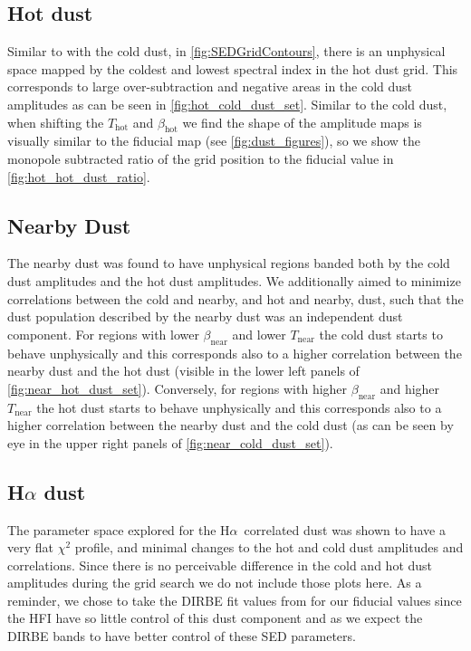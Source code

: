 \documentclass{aa}
\def\Ha{H$\alpha$}
\begin{document}
\subsection{Hot dust}
Similar to with the cold dust, in \cref{fig:SEDGridContours}, there is an unphysical space mapped by the coldest and lowest spectral index in the hot dust grid. This corresponds to large over-subtraction and negative areas in the cold dust amplitudes as can be seen in \cref{fig:hot_cold_dust_set}. Similar to the cold dust, when shifting the $T_\mathrm{hot}$ and $\beta_\mathrm{hot}$ we find the shape of the amplitude maps is visually similar to the fiducial map (see \cref{fig:dust_figures}), so we show the monopole subtracted ratio of the grid position to the fiducial value in \cref{fig:hot_hot_dust_ratio}.

\subsection{Nearby Dust}
The nearby dust was found to have unphysical regions banded both by the cold dust amplitudes and the hot dust amplitudes. We additionally aimed to minimize correlations between the cold and nearby, and hot and nearby, dust, such that the dust population described by the nearby dust was an independent dust component. For regions with lower $\beta_\mathrm{near}$ and lower $T_\mathrm{near}$ the cold dust starts to behave unphysically and this corresponds also to a higher correlation between the nearby dust and the hot dust (visible in the lower left panels of \cref{fig:near_hot_dust_set}). 
Conversely, for regions with higher $\beta_\mathrm{near}$ and higher $T_\mathrm{near}$ the hot dust starts to behave unphysically and this corresponds also to a higher correlation between the nearby dust and the cold dust (as can be seen by eye in the upper right panels of \cref{fig:near_cold_dust_set}). 

\subsection{\texorpdfstring{H$\alpha$}{Ha} dust}
The parameter space explored for the \Ha\ correlated dust was shown to have a very flat $\chi^2$ profile, and minimal changes to the hot and cold dust amplitudes and correlations. Since there is no perceivable difference in the cold and hot dust amplitudes during the grid search we do not include those plots here. As a reminder, we chose to take the DIRBE fit values from \cite{CG02_05} for our fiducial values since the HFI have so little control of this dust component and as we expect the DIRBE bands to have better control of these SED parameters. 
\end{document}
